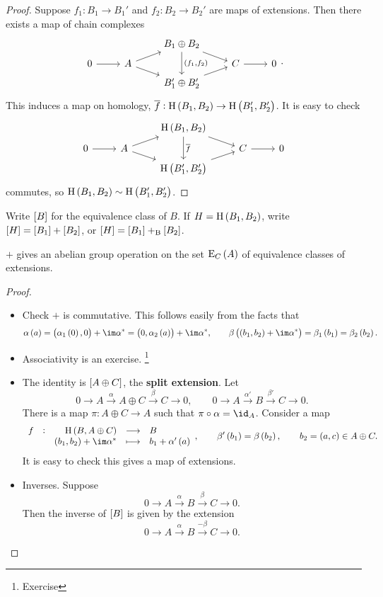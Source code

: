 \begin{proof}
Suppose $ f_1 : B_1 \to B_1' $ and $ f_2 : B_2 \to B_2' $ are maps of extensions. Then there exists a map of chain complexes
$$
\begin{tikzcd}[row sep=tiny]
& & B_1 \oplus B_2 \arrow{dr} \arrow{dd}{\br{f_1, f_2}} & & \\
0 \arrow{r} & A \arrow{ur} \arrow{dr} & & C \arrow{r} & 0 \\
& & B_1' \oplus B_2' \arrow{ur} & &
\end{tikzcd}.
$$
This induces a map on homology, $ \overline{f} : \H\br{B_1, B_2} \to \H\br{B_1', B_2'} $. It is easy to check
$$
\begin{tikzcd}[row sep=tiny]
& & \H\br{B_1, B_2} \arrow{dr} \arrow{dd}{\overline{f}} & & \\
0 \arrow{r} & A \arrow{ur} \arrow{dr} & & C \arrow{r} & 0 \\
& & \H\br{B_1', B_2'} \arrow{ur} & &
\end{tikzcd}
$$
commutes, so $ \H\br{B_1, B_2} \sim \H\br{B_1', B_2'} $.
\end{proof}

Write $ \sbr{B} $ for the equivalence class of $ B $. If $ H = \H\br{B_1, B_2} $, write $ \sbr{H} = \sbr{B_1} + \sbr{B_2} $, or $ \sbr{H} = \sbr{B_1} +_\B \sbr{B_2} $.

\begin{proposition}
$ + $ gives an abelian group operation on the set $ \E_C\br{A} $ of equivalence classes of extensions.
\end{proposition}

\begin{proof}
\hfill
\begin{itemize}
\item Check $ + $ is commutative. This follows easily from the facts that
$$ \alpha\br{a} = \br{\alpha_1\br{0}, 0} + \im \alpha^* = \br{0, \alpha_2\br{a}} + \im \alpha^*, \qquad \beta\br{\br{b_1, b_2} + \im \alpha^*} = \beta_1\br{b_1} = \beta_2\br{b_2}. $$
\item Associativity is an exercise. \footnote{Exercise}
\item The identity is $ \sbr{A \oplus C} $, the \textbf{split extension}. Let
$$ 0 \to A \xrightarrow{\alpha} A \oplus C \xrightarrow{\beta} C \to 0, \qquad 0 \to A \xrightarrow{\alpha'} B \xrightarrow{\beta'} C \to 0. $$
There is a map $ \pi : A \oplus C \to A $ such that $ \pi \circ \alpha = \id_A $. Consider a map
$$ \function[f]{\H\br{B, A \oplus C}}{B}{\br{b_1, b_2} + \im \alpha^*}{b_1 + \alpha'\br{a}}, \qquad \beta'\br{b_1} = \beta\br{b_2}, \qquad b_2 = \br{a, c} \in A \oplus C. $$
It is easy to check this gives a map of extensions.

\pagebreak

\item Inverses. Suppose
$$ 0 \to A \xrightarrow{\alpha} B \xrightarrow{\beta} C \to 0. $$
Then the inverse of $ \sbr{B} $ is given by the extension
$$ 0 \to A \xrightarrow{\alpha} B \xrightarrow{-\beta} C \to 0. $$
\end{itemize}
\end{proof}


